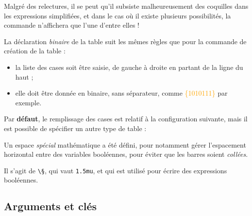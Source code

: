 \documentclass[french,a4paper,11pt]{article}
\newcommand\Cle[1]{{\small\sffamily\textlangle \textcolor{orange}{#1}\textrangle}}
\begin{document}
{{\begin{importantblock}
\smallskip

Malgré des relectures, il se peut qu'il subsiste malheureusement des coquilles dans les expressions simplifiées, et dans le cas où il existe plusieurs possibilités, la commande n'affichera que l'une d'entre elles !
\end{importantblock}

\begin{DemoCode}
\end{DemoCode}

\begin{cautionblock}
La déclaration \textit{binaire} de la table suit les mêmes règles que pour la commande de création de la table :

\begin{itemize}
	\item la liste des cases soit être saisie, de gauche à droite en partant de la ligne du haut ;
	\item elle doit être donnée en binaire, sans séparateur, comme \Cle{\{1010111\}} par exemple.
\end{itemize}
\vspace*{-\baselineskip}\leavevmode
\end{cautionblock}

\begin{importantblock}
Par \textbf{défaut}, le remplissage des cases est relatif à la configuration suivante, mais il est possible de spécifier un autre type de table :

\begin{center}
	\begin{TableKarnaugh}
	\end{TableKarnaugh}
\end{center}
\end{importantblock}

\begin{tipblock}
Un espace \textit{spécial} mathématique a été défini, pour notamment gérer l'espacement horizontal entre des variables booléennes, pour éviter que les barres soient \textit{collées}.

Il s'agit de \texttt{\textbackslash §}, qui vaut \texttt{1.5mu}, et qui est utilisé pour écrire des expressions booléennes.
\end{tipblock}

\pagebreak

\subsection{Arguments et clés }

}}
\end{document}
